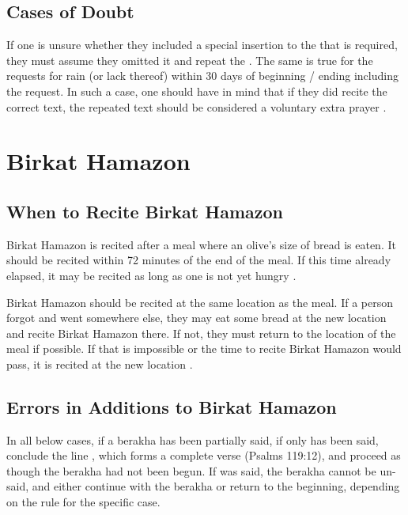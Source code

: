 \subsection{Cases of Doubt}

If one is unsure whether they included a special insertion to the \amidah that is required, they must assume they omitted it and repeat the \amidahnospace.  The same is true for the requests for rain (or lack thereof) within 30 days of beginning / ending including the request.  In such a case, one should have in mind that if they did recite the correct text, the repeated text should be considered a voluntary extra prayer \parencite*[18:6]{PH}.

\section{Birkat Hamazon}

\subsection{When to Recite Birkat Hamazon}

Birkat Hamazon is recited after a meal where an olive's size of bread is eaten. It should be recited within 72 minutes of the end of the meal.  If this time already elapsed, it may be recited as long as one is not yet hungry \parencite*[44:8]{Kitzur}.

Birkat Hamazon should be recited at the same location as the meal. If a person forgot and went somewhere else, they may eat some bread at the new location and recite Birkat Hamazon there. If not, they must return to the location of the meal if possible.  If that is impossible or the time to recite Birkat Hamazon would pass, it is recited at the new location \parencite*[44:9]{Kitzur}.

\subsection{Errors in Additions to Birkat Hamazon}

In all below cases, if a berakha has been partially said, if only  has been said, conclude the line , which forms a complete verse (Psalms 119:12), and proceed as though the berakha had not been begun.  If  was said, the berakha cannot be un-said, and either continue with the berakha or return to the beginning, depending on the rule for the specific case.

